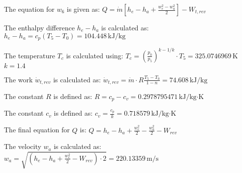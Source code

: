 The equation for \( w_6 \) is given as:  
\( Q = \dot{m} \left[ h_e - h_a + \frac{w_e^2 - w_a^2}{2} \right] - W_{t,rev} \)  

The enthalpy difference \( h_e - h_a \) is calculated as:  
\( h_e - h_a = c_p \left( T_5 - T_0 \right) = 104.448 \, \text{kJ/kg} \)  

The temperature \( T_c \) is calculated using:  
\( T_c = \left( \frac{p_0}{p_5} \right)^{k-1/k} \cdot T_5 = 325.0746969 \, \text{K} \)  
\( k = 1.4 \)  

The work \( \dot{w}_{t,rev} \) is calculated as:  
\( \dot{w}_{t,rev} = \dot{m} \cdot R \frac{T_5 - T_0}{1 - n} = 74.608 \, \text{kJ/kg} \)  

The constant \( R \) is defined as:  
\( R = c_p - c_v = 0.2978795471 \, \text{kJ/kg·K} \)  

The constant \( c_v \) is defined as:  
\( c_v = \frac{c_p}{k} = 0.718579 \, \text{kJ/kg·K} \)  

The final equation for \( Q \) is:  
\( Q = h_e - h_a + \frac{w_e^2}{2} - \frac{w_a^2}{2} - W_{rev} \)  

The velocity \( w_a \) is calculated as:  
\( w_a = \sqrt{\left( h_e - h_a + \frac{w_e^2}{2} - W_{rev} \right) \cdot 2} = 220.13359 \, \text{m/s} \)